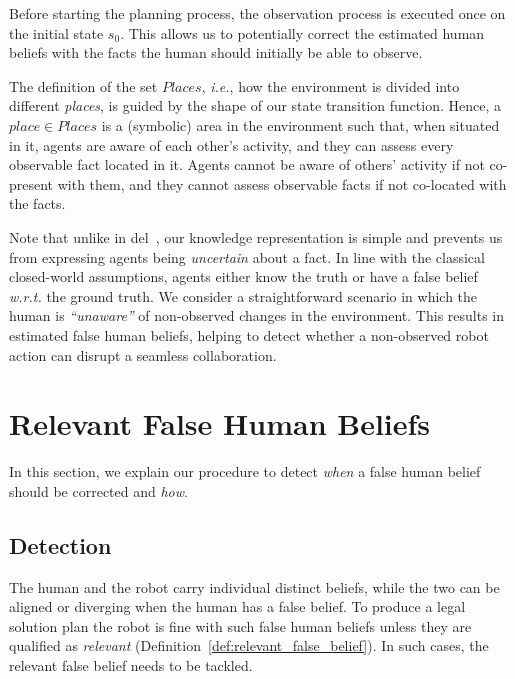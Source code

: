 Before starting the planning process, the observation process is executed once on the initial state $s_0$. This allows us to potentially correct the estimated human beliefs with the facts the human should initially be able to observe. 

The definition of the set $Places$, \textit{i.e.}, how the environment is divided into different \textit{places}, is guided by the shape of our state transition function. Hence, a $place \in Places$ is a (symbolic) area in the environment such that, when situated in it, agents are aware of each other's activity, and they can assess every observable fact located in it. Agents cannot be aware of others' activity if not co-present with them, and they cannot assess observable facts if not co-located with the facts.

Note that unlike in \acrshort{del}~\cite{KR2021-12}, our knowledge representation is simple and prevents us from expressing agents being \textit{uncertain} about a fact. 
In line with the classical closed-world assumptions, agents either know the truth or have a false belief \textit{w.r.t.} the ground truth. 
We consider a straightforward scenario in which the human is \textit{``unaware''} of non-observed changes in the environment. 
This results in estimated false human beliefs, helping to detect whether a non-observed robot action can disrupt a seamless collaboration. 

\section{Relevant False Human Beliefs}

In this section, we explain our procedure to detect \textit{when} a false human belief should be corrected and \textit{how}.


    \subsection{Detection}

The human and the robot carry individual distinct beliefs, while the two can be aligned or diverging when the human has a false belief. To produce a legal solution plan the robot is fine with such false human beliefs unless they are qualified as \textit{relevant} (Definition~\ref{def:relevant_false_belief}). In such cases, the relevant false belief needs to be tackled.

